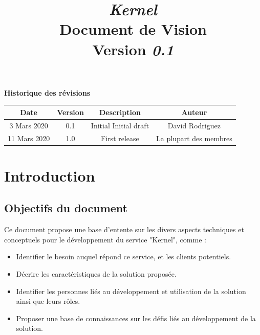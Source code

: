 \documentclass[11pt]{article}
\title{\textit{\Huge Kernel}\\
	Document de Vision\\
	Version \textit{0.1}}
\author{}
\date{}
\begin{document}
\maketitle

\begin{center}
	{\Large \textbf{Historique des révisions}}
	\vspace{5mm}
	
	\begin{tabular}{|c|c|c|c|}
		\hline
		\hspace{4mm}\textbf{Date}\hspace{4mm} & \hspace{4mm}\textbf{Version}\hspace{4mm} & \hspace{4mm}\textbf{Description}\hspace{4mm} & \hspace{4mm}\textbf{Auteur}\hspace{4mm} \\
		\hline
		3 Mars 2020 & 0.1 & Initial Initial draft & David Rodriguez \\
		\hline
		11 Mars 2020 & 1.0 & First release & La plupart des membres \\
		\hline
	\end{tabular}
\end{center}

\vspace{16mm}

\section{Introduction}


\subsection{Objectifs du document}


Ce document propose une base d'entente sur les divers aspects techniques et conceptuels pour le développement du service "Kernel", comme :
\begin{itemize}
	\item Identifier le besoin auquel répond ce service, et les clients potentiels.
	\item Décrire les caractéristiques de la solution proposée.
	\item Identifier les personnes liés au développement et utilisation de la solution ainsi que leurs rôles.
	\item Proposer une base de connaissances sur les défis liés au développement de la solution.
\end{itemize}
\end{document}
